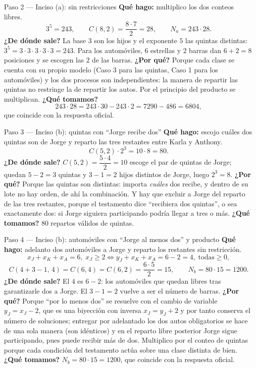 \documentclass[11pt]{article}
\begin{document}
\begin{paso}{Paso 2 --- Inciso (a): sin restricciones}
\textbf{Qué hago:} multiplico los dos conteos libres.
\[
3^5=243,\qquad C(8,2)=\frac{8\cdot 7}{2}=28,\qquad N_a=243\cdot 28 .
\]
\textbf{¿De dónde sale?} La base $3$ son los hijos y el exponente $5$ las quintas distintas: $3^5=3\cdot3\cdot3\cdot3\cdot3=243$. Para los automóviles, $6$ estrellas y $2$ barras dan $6+2=8$ posiciones y se escogen las $2$ de las barras.
\textbf{¿Por qué?} Porque cada clase se cuenta con su propio modelo (Caso 3 para las quintas, Caso 1 para los automóviles) y los dos procesos son independientes: la manera de repartir las quintas no restringe la de repartir los autos. Por el principio del producto se multiplican.
\textbf{¿Qué tomamos?}
\[
243\cdot 28=243\cdot 30-243\cdot 2=7290-486=6804 ,
\]
que coincide con la respuesta oficial.
\end{paso}

\begin{paso}{Paso 3 --- Inciso (b): quintas con ``Jorge recibe dos''}
\textbf{Qué hago:} escojo cuáles dos quintas son de Jorge y reparto las tres restantes entre Karla y Anthony.
\[
C(5,2)\cdot 2^3=10\cdot 8=80 .
\]
\textbf{¿De dónde sale?} $C(5,2)=\dfrac{5\cdot4}{2}=10$ escoge el par de quintas de Jorge; quedan $5-2=3$ quintas y $3-1=2$ hijos distintos de Jorge, luego $2^3=8$.
\textbf{¿Por qué?} Porque las quintas son distintas: importa \emph{cuáles} dos recibe, y dentro de su lote no hay orden, de ahí la combinación. Y hay que excluir a Jorge del reparto de las tres restantes, porque el testamento dice ``recibiera dos quintas'', o sea exactamente dos: si Jorge siguiera participando podría llegar a tres o más.
\textbf{¿Qué tomamos?} $80$ repartos válidos de quintas.
\end{paso}

\begin{paso}{Paso 4 --- Inciso (b): automóviles con ``Jorge al menos dos'' y producto}
\textbf{Qué hago:} adelanto dos automóviles a Jorge y reparto los restantes sin restricción.
\[
x_J+x_K+x_A=6,\;x_J\ge2\iff y_J+x_K+x_A=6-2=4,\;\text{todas}\ge0,
\]
\[
C(4+3-1,\,4)=C(6,4)=C(6,2)=\frac{6\cdot 5}{2}=15,\qquad N_b=80\cdot 15=1200 .
\]
\textbf{¿De dónde sale?} El $4$ es $6-2$: los automóviles que quedan libres tras garantizarle dos a Jorge. El $3-1=2$ vuelve a ser el número de barras.
\textbf{¿Por qué?} Porque ``por lo menos dos'' se resuelve con el cambio de variable $y_J=x_J-2$, que es una biyección con inversa $x_J=y_J+2$ y por tanto conserva el número de soluciones; entregar por adelantado los dos autos obligatorios se hace de una sola manera (son idénticos) y en el reparto libre posterior Jorge sigue participando, pues puede recibir más de dos. Multiplico por el conteo de quintas porque cada condición del testamento actúa sobre una clase distinta de bien.
\textbf{¿Qué tomamos?} $N_b=80\cdot 15=1200$, que coincide con la respuesta oficial.
\end{paso}
\end{document}
